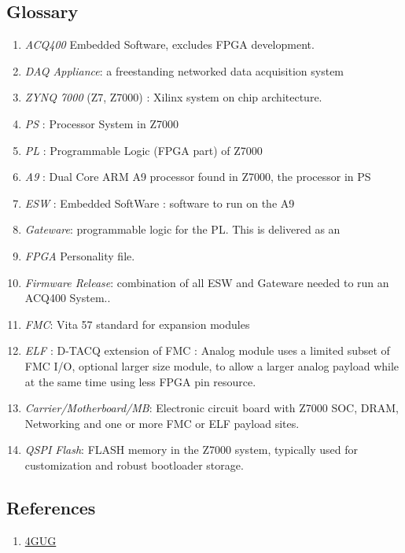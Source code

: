 \documentclass[]{article}
\newcommand{\glossy}[1]{{\color{blue}\itshape #1}}
\begin{document}
\subsection{Glossary}
\begin{enumerate}
    \item \glossy{ACQ400} Embedded Software, excludes FPGA development.
    \item \glossy{DAQ Appliance}: a freestanding networked data acquisition system
    \item \glossy{ZYNQ 7000} (Z7, Z7000)  : Xilinx system on chip architecture.
    \item \glossy{PS} : Processor System in Z7000
    \item \glossy{PL} : Programmable Logic (FPGA part) of Z7000
    \item \glossy{A9} : Dual Core ARM A9 processor found in Z7000, the processor in PS
    \item \glossy{ESW} : Embedded SoftWare : software to run on the A9
    \item \glossy{Gateware}: programmable logic for the PL. This is delivered as an 
    \item \glossy{FPGA} Personality file.
    \item \glossy{Firmware Release}: combination of all ESW and Gateware needed to run an ACQ400 System..
    \item \glossy{FMC}: Vita 57 standard for expansion modules
    \item \glossy{ELF} : D-TACQ extension of FMC : Analog module uses a limited subset of FMC I/O, optional larger size module, to allow a larger analog payload while at the same time using less FPGA pin resource.
    \item \glossy{Carrier/Motherboard/MB}: Electronic circuit board with Z7000 SOC, DRAM, Networking and one or more FMC or ELF payload sites.
    \item \glossy{QSPI Flash}: FLASH memory in the Z7000 system, typically used for customization and robust bootloader storage.       
\end{enumerate}

\subsection{References}
\begin{enumerate}
    \item \href{https://github.com/seanalsop/bolodsp-doc/releases}{4GUG}
\end{enumerate} 
\end{document}
